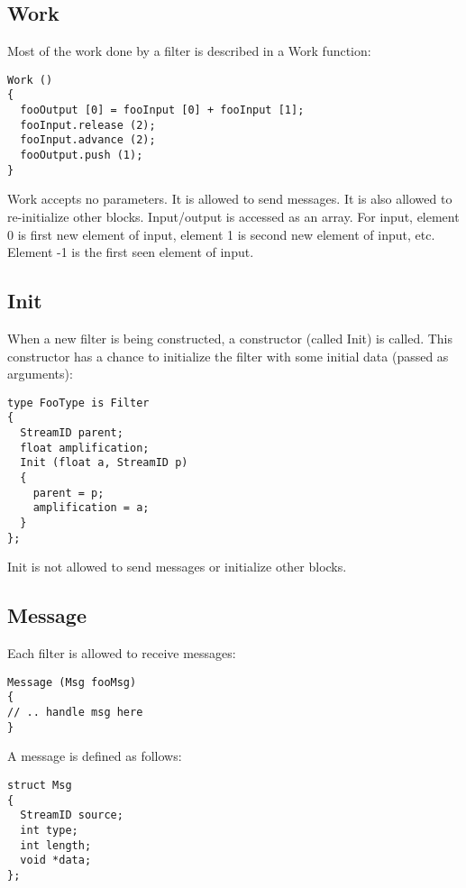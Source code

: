 \subsection{Work}

Most of the work done by a filter is described in a Work function:

\begin{verbatim}
Work ()
{
  fooOutput [0] = fooInput [0] + fooInput [1];
  fooInput.release (2);
  fooInput.advance (2);
  fooOutput.push (1);
}
\end{verbatim}

Work accepts no parameters.  It is allowed to send messages.  It is also
allowed to re-initialize other blocks.
Input/output
is accessed as an array.  For input, element 0 is first new element of input,
element 1 is second new element of input, etc.  Element -1 is the first seen
element of input.

\subsection{Init}

When a new filter is being constructed, a constructor (called Init) is called.
This constructor has a chance to initialize the filter with some initial
data (passed as arguments):

\begin{verbatim}
type FooType is Filter
{
  StreamID parent;
  float amplification;
  Init (float a, StreamID p)
  {
    parent = p;
    amplification = a;
  }
};
\end{verbatim}

Init is not allowed to send messages or initialize other blocks.

\subsection{Message}

Each filter is allowed to receive messages:

\begin{verbatim}
Message (Msg fooMsg)
{
// .. handle msg here
}
\end{verbatim}

A message is defined as follows:

\begin{verbatim}
struct Msg
{
  StreamID source;
  int type;
  int length;
  void *data;
};
\end{verbatim}

